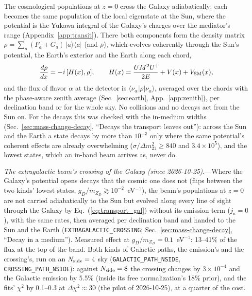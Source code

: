 \documentclass[11pt,a4paper]{article}
\newcommand{\mzd}{m_{Z_D}}
\newcommand{\gd}{g_D}
\begin{document}
The cosmological populations at $z = 0$ cross the Galaxy adiabatically: each becomes the same population of the local
eigenstate at the Sun, where the potential is the Yukawa integral of the Galaxy's charges over the mediator's range
(Appendix~\ref{app:transit}). There both components form the density matrix
$\rho = \sum_a (F_a + G_a)\,|a\rangle\langle a|$ (and $\bar\rho$), which evolves coherently through the Sun's potential,
the Earth's exterior and the Earth along each chord,
\begin{equation}
\frac{d\rho}{dx} = -i\,[H(x), \rho], \qquad H(x) = \frac{UM^2U^\dagger}{2E} + V(x) + V_{\rm SM}(x),
\end{equation}
and the flux of flavor $\alpha$ at the detector is $\langle\nu_\alpha|\rho|\nu_\alpha\rangle$, averaged over the chords
with the phase-aware zenith average (Sec.~\ref{sec:earth}, App.~\ref{app:zenith}), per declination band or for the whole
sky. No collisions and no decays act from the Sun on. For the decays this was checked with the in-medium widths
(Sec.~\ref{sec:mass-change-decay}, ``Decays the transport leaves out''): across the Sun and the Earth a state decays by
more than $10^{-3}$ only where the same potential's coherent effects are already overwhelming ($\sigma/\Delta m^2_{21}
\ge 840$ and $3.4\times10^5$), and the lowest states, which an in-band beam arrives as, never do.

\textit{The extragalactic beam's crossing of the Galaxy (since 2026-10-25).}---Where the Galaxy's potential opens decays
that the cosmic one does not (flips between the two kinds' lowest states, $\gd/\mzd \gtrsim 10^{-2}$~eV$^{-1}$), the
beam's populations at $z = 0$ are not carried adiabatically to the Sun but evolved along every line of sight through the
Galaxy by Eq.~(\ref{eq:transport_gal}) without its emission term ($j_a = 0$), with the same rates, then averaged per
declination band and handed to the Sun and the Earth (\texttt{EXTRAGALACTIC\_CROSSING}; Sec.~\ref{sec:mass-change-decay},
``Decay in a medium''). Measured effect at $\gd/\mzd = 0.1$~eV$^{-1}$: 13--41\% of the flux at the top of the band.
Both kinds of Galactic paths, the emission's and the crossing's, run on an $N_{\rm side} = 4$ sky
(\texttt{GALACTIC\_PATH\_NSIDE}, \texttt{CROSSING\_PATH\_NSIDE}): against $N_{\rm side} = 8$ the crossing changes by
$3\times10^{-4}$ and the Galactic emission by 5.5\% (inside its free normalization's 18\% prior), and the fits'
$\chi^2$ by 0.1--0.3 at $\Delta\chi^2 \approx 30$ (the pilot of 2026-10-25), at a quarter of the cost.
\end{document}

